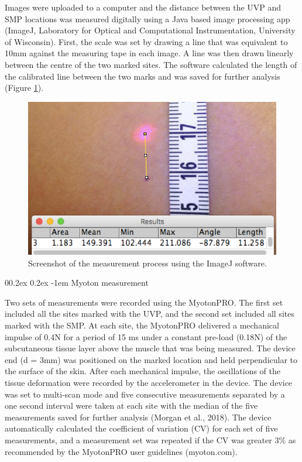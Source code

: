 \documentclass[
  english,
  man,floatsintext]{apa6}
\makeatletter
\renewcommand{\paragraph}{\@startsection{paragraph}{4}{\parindent}%
  {0\baselineskip \@plus 0.2ex \@minus 0.2ex}%
  {-1em}%
  {\normalfont\normalsize\bfseries\itshape\typesectitle}}
\makeatother
\begin{document}
Images were uploaded to a computer and the distance between the UVP and SMP locations was measured digitally using a Java based image processing app (ImageJ, Laboratory for Optical and Computational Instrumentation, University of Wisconsin).
First, the scale was set by drawing a line that was equivalent to 10mm against the measuring tape in each image.
A line was then drawn linearly between the centre of the two marked sites.
The software calculated the length of the calibrated line between the two marks and was saved for further analysis (Figure \ref{fig:imagej}).

\begin{figure}[H]

{\centering \includegraphics[width=1\linewidth]{figs/measures/measurement} 

}

\caption{Screenshot of the measurement process using the ImageJ software.}\label{fig:imagej}
\end{figure}

\hypertarget{myoton-measurement}{%
\paragraph{Myoton measurement}\label{myoton-measurement}}

Two sets of measurements were recorded using the MyotonPRO.
The first set included all the sites marked with the UVP, and the second set included all sites marked with the SMP.
At each site, the MyotonPRO delivered a mechanical impulse of 0.4N for a period of 15 ms under a constant pre-load (0.18N) of the subcutaneous tissue layer above the muscle that was being measured.
The device end (d = 3mm) was positioned on the marked location and held perpendicular to the surface of the skin.
After each mechanical impulse, the oscillations of the tissue deformation were recorded by the accelerometer in the device.
The device was set to multi-scan mode and five consecutive measurements separated by a one second interval were taken at each site with the median of the five measurements saved for further analysis (Morgan et al., 2018).
The device automatically calculated the coefficient of variation (CV) for each set of five measurements, and a measurement set was repeated if the CV was greater 3\% as recommended by the MyotonPRO user guidelines (myoton.com).
\end{document}
